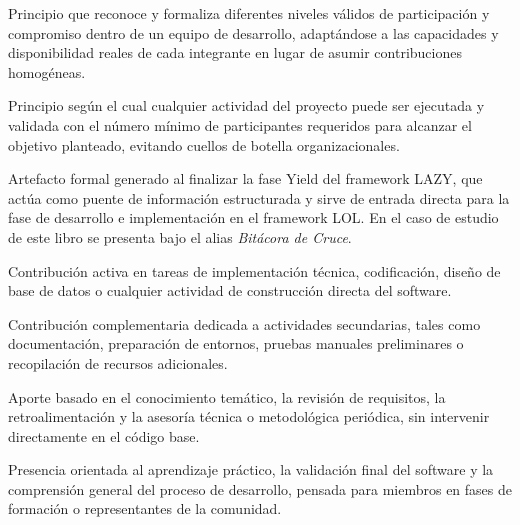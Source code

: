\documentclass[14pt,a4paper,oneside]{extbook}
\begin{document}
\begin{description}[leftmargin=2em, style=nextline]
\item[\textcolor{primary}{Participación Adaptativa}] Principio que reconoce y formaliza diferentes niveles válidos de participación y compromiso dentro de un equipo de desarrollo, adaptándose a las capacidades y disponibilidad reales de cada integrante en lugar de asumir contribuciones homogéneas.

\item[\textcolor{primary}{Suficiencia Operativa}] Principio según el cual cualquier actividad del proyecto puede ser ejecutada y validada con el número mínimo de participantes requeridos para alcanzar el objetivo planteado, evitando cuellos de botella organizacionales.

\item[\textcolor{primary}{Documento de Transferencia}] Artefacto formal generado al finalizar la fase Yield del framework LAZY, que actúa como puente de información estructurada y sirve de entrada directa para la fase de desarrollo e implementación en el framework LOL. En el caso de estudio de este libro se presenta bajo el alias \textit{Bitácora de Cruce}.

\item[\textcolor{primary}{Participación Directa}] Contribución activa en tareas de implementación técnica, codificación, diseño de base de datos o cualquier actividad de construcción directa del software.

\item[\textcolor{primary}{Participación de Apoyo}] Contribución complementaria dedicada a actividades secundarias, tales como documentación, preparación de entornos, pruebas manuales preliminares o recopilación de recursos adicionales.

\item[\textcolor{primary}{Participación Consultiva}] Aporte basado en el conocimiento temático, la revisión de requisitos, la retroalimentación y la asesoría técnica o metodológica periódica, sin intervenir directamente en el código base.

\item[\textcolor{primary}{Participación Observacional}] Presencia orientada al aprendizaje práctico, la validación final del software y la comprensión general del proceso de desarrollo, pensada para miembros en fases de formación o representantes de la comunidad.
\end{description}
\end{document}
